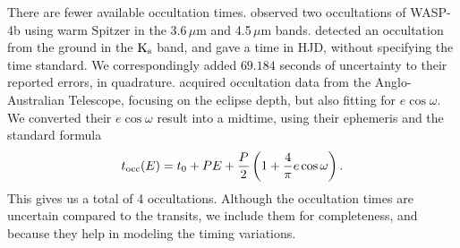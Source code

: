 \documentclass[12pt,twocolumn,tighten]{aastex62}
\begin{document}

There are fewer available occultation times.
\citet{beerer_secondary_2011} observed two occultations of WASP-4b using
warm Spitzer in the 3.6\,$\mu$m and 4.5\,$\mu$m bands.
\citet{caceres_ground-based_2011} detected an occultation from the
ground in the ${\rm K}_{\rm s}$ band, and gave a time in HJD, without
specifying the time standard.  We correspondingly added $69.184$ seconds
of uncertainty to their reported errors, in quadrature.
\citet{zhou_secondary_2015} acquired
occultation data from the Anglo-Australian Telescope, focusing on the
eclipse depth, but also fitting for $e\cos\omega$.  We converted their
$e\cos\omega$ result into a midtime, using their ephemeris and the
standard formula \citep[{\it
e.g.},][]{charbonneau_detection_2005,winn_exoplanet_2010}
\begin{equation}
  t_{\rm occ}(E) =
  t_0 +  P E  +
  \frac{P}{2} \left( 1 + \frac{4}{\pi} e\cos\omega \right).
  \label{eq:occultation_time}
\end{equation}
This gives us a total of 4 occultations.  Although the occultation
times are uncertain compared to the transits, we include them for
completeness, and because they help in modeling the timing
variations.
\end{document}
